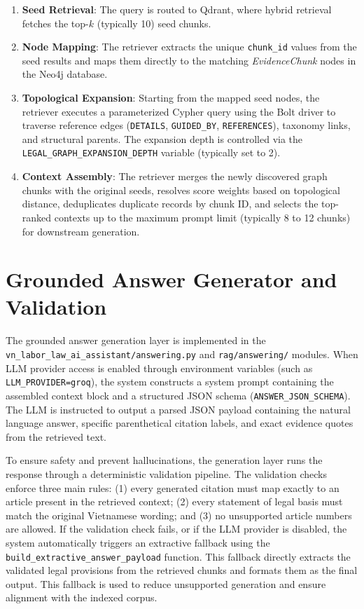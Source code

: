 \begin{enumerate}
  \item \textbf{Seed Retrieval}: The query is routed to Qdrant, where hybrid retrieval fetches the top-$k$ (typically 10) seed chunks.
  \item \textbf{Node Mapping}: The retriever extracts the unique \texttt{chunk\_id} values from the seed results and maps them directly to the matching \textit{EvidenceChunk} nodes in the Neo4j database.
  \item \textbf{Topological Expansion}: Starting from the mapped seed nodes, the retriever executes a parameterized Cypher query using the Bolt driver to traverse reference edges (\texttt{DETAILS}, \texttt{GUIDED\_BY}, \texttt{REFERENCES}), taxonomy links, and structural parents. The expansion depth is controlled via the \texttt{LEGAL\_GRAPH\_EXPANSION\_DEPTH} variable (typically set to 2).
  \item \textbf{Context Assembly}: The retriever merges the newly discovered graph chunks with the original seeds, resolves score weights based on topological distance, deduplicates duplicate records by chunk ID, and selects the top-ranked contexts up to the maximum prompt limit (typically 8 to 12 chunks) for downstream generation.
\end{enumerate}

\section{Grounded Answer Generator and Validation}
The grounded answer generation layer is implemented in the \texttt{vn\_labor\_law\_ai\_assistant/\allowbreak{}answering.py} and \texttt{rag/\allowbreak{}answering/} modules. When LLM provider access is enabled through environment variables (such as \texttt{LLM\_PROVIDER=groq}), the system constructs a system prompt containing the assembled context block and a structured JSON schema (\texttt{ANSWER\_\allowbreak{}JSON\_\allowbreak{}SCHEMA}). The LLM is instructed to output a parsed JSON payload containing the natural language answer, specific parenthetical citation labels, and exact evidence quotes from the retrieved text.

To ensure safety and prevent hallucinations, the generation layer runs the response through a deterministic validation pipeline. The validation checks enforce three main rules: (1) every generated citation must map exactly to an article present in the retrieved context; (2) every statement of legal basis must match the original Vietnamese wording; and (3) no unsupported article numbers are allowed. If the validation check fails, or if the LLM provider is disabled, the system automatically triggers an extractive fallback using the \texttt{build\_extractive\_answer\_payload} function. This fallback directly extracts the validated legal provisions from the retrieved chunks and formats them as the final output. This fallback is used to reduce unsupported generation and ensure alignment with the indexed corpus.

